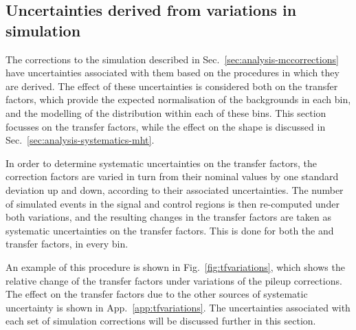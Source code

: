 \subsection{Uncertainties derived from variations in simulation}
\label{sec:analysis-systematics-mc}
The corrections to the simulation described in 
Sec.~\ref{sec:analysis-mccorrections} have uncertainties associated with them 
based on the procedures in which they are derived. The effect of these 
uncertainties is considered both on the transfer 
factors, which provide the expected normalisation of the backgrounds in each 
\njnbht bin, and the modelling of the \mht distribution within each of these 
bins. This section focusses on the transfer factors, while the effect on the 
\mht shape is discussed in Sec.~\ref{sec:analysis-systematics-mht}.

In order to determine systematic uncertainties on the transfer factors, the 
correction factors are varied in turn from their nominal values by one standard 
deviation up and down, according to their associated uncertainties. The number 
of simulated events in the signal and control regions is then re-computed under 
both variations, and the resulting changes in the transfer factors are taken as 
systematic uncertainties on the transfer factors. This is done for both the 
\Tmutottw and \Tmumutoz transfer factors, in every \njnbht bin. 

An example of this procedure is 
shown in Fig.~\ref{fig:tfvariations}, which shows the relative change 
of the transfer factors under variations of the pileup corrections. 
The effect on the transfer factors due to the other sources of systematic 
uncertainty is shown in App.~\ref{app:tfvariations}.
The uncertainties associated with each set of simulation corrections will be  
discussed further in this section.

